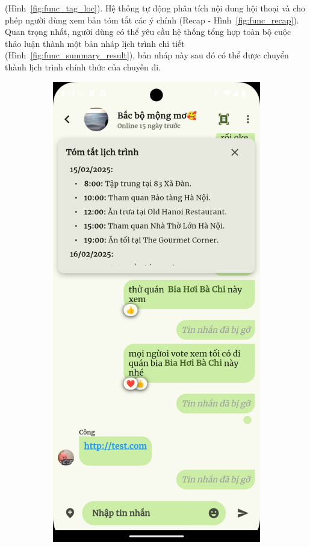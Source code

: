 (Hình~\ref{fig:func_tag_loc}). Hệ thống tự động phân tích nội dung hội thoại và cho phép người dùng xem bản tóm tắt các ý chính (Recap - Hình~\ref{fig:func_recap}). Quan trọng nhất, người dùng có thể yêu cầu hệ thống tổng hợp toàn bộ cuộc thảo luận thành một bản nháp lịch trình chi tiết (Hình~\ref{fig:func_summary_result}), bản nháp này sau đó có thể được chuyển thành lịch trình chính thức của chuyến đi.

\begin{figure}[H]
    \centering
    \begin{subfigure}{0.326\textwidth}
        \includegraphics[width=1\linewidth]{figures/c4/system_func/recap.png}

\end{subfigure}
\end{figure}
